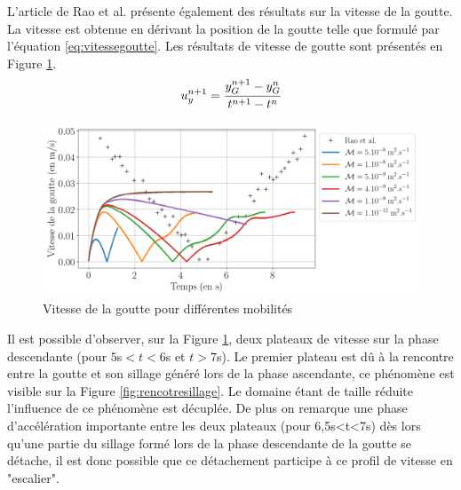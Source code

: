 L'article de Rao et al. présente également des résultats sur la vitesse de la goutte. La vitesse est obtenue en dérivant la position de la goutte telle que formulé par l'équation \ref{eq:vitessegoutte}. Les résultats de vitesse de goutte sont présentés en Figure \ref{fig:vitesseexp4}.
	\begin{equation} \label{eq:vitessegoutte}
	u_y^{n+1} = \cfrac{y_G^{n+1} - y_G^{n}}{t^{n+1}- t^n}
\end{equation}
\begin{figure}[H]
	\centering
	\includegraphics[width=0.9\linewidth]{figure/vitesse_Exp4}
	\caption[Vitesse de la goutte pour différentes mobilités]{Vitesse de la goutte pour différentes mobilités}
	\label{fig:vitesseexp4}
\end{figure}
Il est possible d'observer, sur la Figure \ref{fig:vitesseexp4}, deux plateaux de vitesse sur la phase descendante (pour $5$s$<t<6$s et $t>7$s). Le premier plateau est dû à la rencontre entre la goutte et son sillage généré lors de la phase ascendante, ce phénomène est visible sur la Figure \ref{fig:rencotresillage}. Le domaine étant de taille réduite l'influence de ce phénomène est décuplée. De plus on remarque une phase d'accélération importante entre les deux plateaux (pour 6,5s<t<7s) dès lors qu'une partie du sillage formé lors de la phase descendante de la goutte se détache, il est donc possible que ce détachement participe à ce profil de vitesse en "escalier". 

